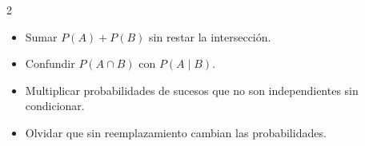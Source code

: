 \documentclass[10pt]{article}
\begin{document}
\begin{multicols}{2}
\begin{ojo}
\begin{itemize}
  \item Sumar \(P(A)+P(B)\) sin restar la intersección.
  \item Confundir \(P(A\cap B)\) con \(P(A\mid B)\).
  \item Multiplicar probabilidades de sucesos que no son independientes sin condicionar.
  \item Olvidar que sin reemplazamiento cambian las probabilidades.
\end{itemize}
\end{ojo}

\end{multicols}
\end{document}
